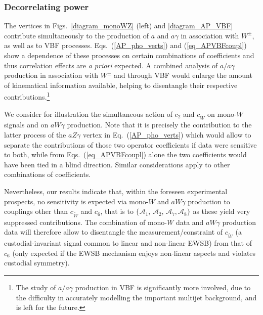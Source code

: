 \documentclass[11pt]{article}
\newcommand{\A}{\mathcal{A}}
\renewcommand{\[}{\begin{equation}}
\renewcommand{\]}{\end{equation}}
\newcounter{diagram}
\begin{document}
  
 
\vspace{-0.3cm}

\subsubsection*{Decorrelating power}

\vspace{-0.2cm}

The vertices in Figs.~\ref{diagram_monoWZ} (left) and \ref{diagram_AP_VBF} contribute simultaneously to
the production of $a$ and $a\gamma$ in association with $W^{\pm}$, as well as to  
 VBF processes.  Eqs.~(\ref{AP_pho_verts}) and (\ref{eq_APVBFcoupl}) show a dependence of these processes on certain combinations of coefficients 
 and thus correlation effects are {\it a priori} expected. A combined analysis of $a/a\gamma$ production in association with $W^{\pm}$ and through VBF would enlarge the amount of kinematical information available, helping to disentangle their respective contributions.\footnote {The study of $a/a\gamma$ production in VBF is  significantly more involved, 
due to the difficulty in accurately modelling the important 
multijet background, and is left for the future.}

We consider for illustration the simultaneous action of  $c_2$ and $c_{\tilde{W}}$ on mono-$W$ signals and on $aW\gamma$ production. Note that it is precisely the contribution to the latter process of the $aZ\gamma$ vertex in Eq.~(\ref{AP_pho_verts})  which would allow to separate the contributions of those two operator coefficients if data were sensitive to both,  
 while from Eqs.~(\ref{eq_APVBFcoupl}) alone the two coefficients would have been tied in a  blind direction. Similar considerations  apply to other combinations of coefficients. 

 Nevertheless, our results indicate that, within the foreseen experimental prospects, no sensitivity is 
 expected via mono-$W$ and $aW\gamma$ production to couplings other than $c_{\tilde{W}}$ and $c_6$,  that is to $\{ \A_1,\,\A_2,\, \A_7, \A_8\}$ as these yield very suppressed contributions. The combination of mono-$W$ data and $aW\gamma$ production data will therefore allow to disentangle the measurement/constraint of $c_{\tilde{W}}$   (a custodial-invariant signal common to linear and non-linear EWSB)  from that of $c_6$ (only expected if the EWSB mechanism enjoys non-linear aspects and violates custodial symmetry).


\vspace{2mm}
\end{document}
